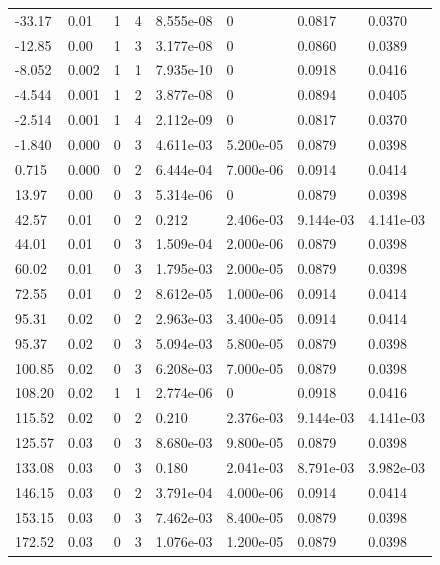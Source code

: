 \documentclass[preview]{standalone}
\begin{document}
{{\begin{tabular}{L{1.2cm}C{1.2cm} C{0.3cm}C{0.5cm} C{1.4cm}C{1.4cm} C{1.4cm}C{1.4cm}}
  -33.17  &  0.01  & 1     &  4 &  8.555e-08  & 0  & 0.0817 &  0.0370   \\ 
  -12.85  &  0.00  & 1     &  3 &  3.177e-08  & 0  & 0.0860 &  0.0389   \\ 
  -8.052  &  0.002  & 1     &  1 &  7.935e-10  & 0  & 0.0918 &  0.0416   \\ 
  -4.544  &  0.001  & 1     &  2 &  3.877e-08  & 0  & 0.0894 &  0.0405   \\ 
  -2.514  &  0.001  & 1     &  4 &  2.112e-09  & 0  & 0.0817 &  0.0370   \\ 
  -1.840  &  0.000  & 0     &  3 &  4.611e-03  & 5.200e-05  & 0.0879 &  0.0398   \\ 
  0.715  &  0.000  & 0     &  2 &  6.444e-04  & 7.000e-06  & 0.0914 &  0.0414   \\ 
  13.97  &  0.00  & 0     &  3 &  5.314e-06  & 0  & 0.0879 &  0.0398   \\ 
  42.57  &  0.01  & 0     &  2 &  0.212  & 2.406e-03  & 9.144e-03 &  4.141e-03   \\ 
  44.01  &  0.01  & 0     &  3 &  1.509e-04  & 2.000e-06  & 0.0879 &  0.0398   \\ 
  60.02  &  0.01  & 0     &  3 &  1.795e-03  & 2.000e-05  & 0.0879 &  0.0398   \\ 
  72.55  &  0.01  & 0     &  2 &  8.612e-05  & 1.000e-06  & 0.0914 &  0.0414   \\ 
  95.31  &  0.02  & 0     &  2 &  2.963e-03  & 3.400e-05  & 0.0914 &  0.0414   \\ 
  95.37  &  0.02  & 0     &  3 &  5.094e-03  & 5.800e-05  & 0.0879 &  0.0398   \\ 
  100.85  &  0.02  & 0     &  3 &  6.208e-03  & 7.000e-05  & 0.0879 &  0.0398   \\ 
  108.20  &  0.02  & 1     &  1 &  2.774e-06  & 0  & 0.0918 &  0.0416   \\ 
  115.52  &  0.02  & 0     &  2 &  0.210  & 2.376e-03  & 9.144e-03 &  4.141e-03   \\ 
  125.57  &  0.03  & 0     &  3 &  8.680e-03  & 9.800e-05  & 0.0879 &  0.0398   \\ 
  133.08  &  0.03  & 0     &  3 &  0.180  & 2.041e-03  & 8.791e-03 &  3.982e-03   \\ 
  146.15  &  0.03  & 0     &  2 &  3.791e-04  & 4.000e-06  & 0.0914 &  0.0414   \\ 
  153.15  &  0.03  & 0     &  3 &  7.462e-03  & 8.400e-05  & 0.0879 &  0.0398   \\ 
  172.52  &  0.03  & 0     &  3 &  1.076e-03  & 1.200e-05  & 0.0879 &  0.0398   \\ 

\end{tabular}}}
\end{document}
